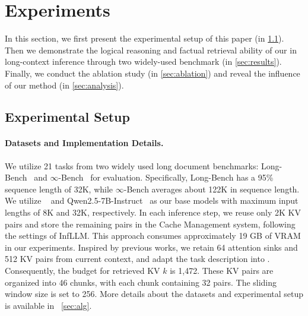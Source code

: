 
\vspace{-0.5em}
\section{Experiments}
In this section, we first present the experimental setup of this paper (in \cref{sec:setup}). Then we demonstrate the logical reasoning and factual retrieval ability of our \name in long-context inference through two widely-used benchmark (in \cref{sec:results}). Finally, we conduct the ablation study (in \cref{sec:ablation}) and reveal the influence of our method (in \cref{sec:analysis}).


\subsection{Experimental Setup}
\label{sec:setup}

\paragraph{Datasets and Implementation Details.}
We utilize 21 tasks from two widely used long document benchmarks: Long-Bench~\cite{longbench} and $\infty$-Bench~\cite{infinitebench} for evaluation. Specifically, 
Long-Bench has a 95\% sequence length of 32K, while $\infty$-Bench averages about 122K in sequence length.  We utilize \basellama~\cite{llama3} and  Qwen2.5-7B-Instruct~\cite{qwen2.5} as our base models with maximum input lengths of 8K and 32K, respectively.
In each inference step, we reuse only 2K KV pairs and store the remaining pairs in the Cache Management system, following the settings of InfLLM. This approach consumes approximately 19 GB of VRAM in our experiments. Inspired by previous works, we retain 64 attention sinks and 512 KV pairs from current context, and adapt the task description into \pq. Consequently, the budget for retrieved KV $k$ is 1,472. These KV pairs are organized into 46 chunks, with each chunk containing 32 pairs. The sliding window size is set to 256. {More details about the datasets and experimental setup is available in ~\cref{sec:alg}.}


